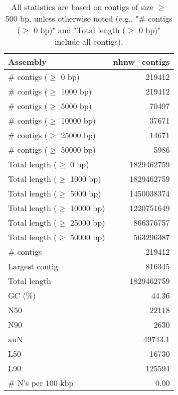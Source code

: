 \documentclass[12pt,a4paper]{article}
\begin{document}
\begin{table}[ht]
\begin{center}
\caption{All statistics are based on contigs of size $\geq$ 500 bp, unless otherwise noted (e.g., "\# contigs ($\geq$ 0 bp)" and "Total length ($\geq$ 0 bp)" include all contigs).}
\begin{tabular}{|l*{1}{|r}|}
\hline
Assembly & nhnw\_contigs \\ \hline
\# contigs ($\geq$ 0 bp) & 219412 \\ \hline
\# contigs ($\geq$ 1000 bp) & 219412 \\ \hline
\# contigs ($\geq$ 5000 bp) & 70497 \\ \hline
\# contigs ($\geq$ 10000 bp) & 37671 \\ \hline
\# contigs ($\geq$ 25000 bp) & 14671 \\ \hline
\# contigs ($\geq$ 50000 bp) & 5986 \\ \hline
Total length ($\geq$ 0 bp) & 1829462759 \\ \hline
Total length ($\geq$ 1000 bp) & 1829462759 \\ \hline
Total length ($\geq$ 5000 bp) & 1450038374 \\ \hline
Total length ($\geq$ 10000 bp) & 1220751649 \\ \hline
Total length ($\geq$ 25000 bp) & 866376757 \\ \hline
Total length ($\geq$ 50000 bp) & 563296387 \\ \hline
\# contigs & 219412 \\ \hline
Largest contig & 816345 \\ \hline
Total length & 1829462759 \\ \hline
GC (\%) & 44.36 \\ \hline
N50 & 22118 \\ \hline
N90 & 2630 \\ \hline
auN & 49743.1 \\ \hline
L50 & 16730 \\ \hline
L90 & 125594 \\ \hline
\# N's per 100 kbp & 0.00 \\ \hline
\end{tabular}
\end{center}
\end{table}
\end{document}
